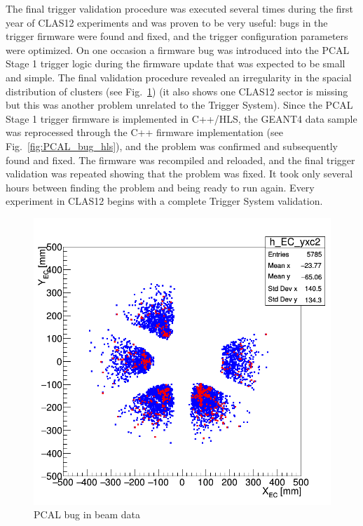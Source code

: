 The final trigger validation procedure was executed several times during the first year of CLAS12 experiments and was proven to be very useful: bugs in the trigger firmware were found and fixed, and the trigger configuration parameters were optimized. On one occasion a firmware bug was introduced into the PCAL Stage 1 trigger logic during the firmware update that was expected to be small and simple. The final validation procedure revealed an irregularity in the spacial distribution of clusters (see Fig.~\ref{fig:PCAL_bug_data}) (it also shows one CLAS12 sector is missing but this was another problem unrelated to the Trigger System). Since the PCAL Stage 1 trigger firmware is implemented in C++/HLS, the GEANT4 data sample was reprocessed through the C++ firmware implementation (see Fig.~\ref{fig:PCAL_bug_hls}), and the problem was confirmed and subsequently found and fixed. The firmware was recompiled and reloaded, and the final trigger validation was repeated showing that the problem was fixed. It took only several hours between finding the problem and being ready to run again. Every experiment in CLAS12 begins with a complete Trigger System validation. 

\begin{figure}[hbt]
	\centering
	\includegraphics[width=1.0\columnwidth,keepaspectratio]{img/PCAL_bug_data.png}
	\caption{PCAL bug in beam data}
	\label{fig:PCAL_bug_data}
\end{figure}

